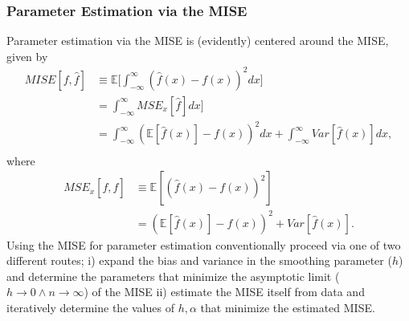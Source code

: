 \subsubsection{Parameter Estimation via the MISE}
Parameter estimation via the MISE is (evidently) centered around the MISE, given by
\begin{equation}
	\begin{split}
		MISE[f,\hat{f}]&\equiv \mathbb{E}\bigg[\int_{-\infty}^{\infty} (\hat{f}(x)-f(x))^2dx\bigg]\\
		&= \int_{-\infty}^{\infty} MSE_x[\hat{f}]dx\bigg]\\
		&= \int_{-\infty}^{\infty} (\mathbb{E}[\hat{f}(x)]-f(x))^2dx+\int_{-\infty}^{\infty}Var[\hat{f}(x)]dx,\\
	\end{split}
	\label{mse1}
\end{equation}
where
\begin{equation}
	\begin{split}
		MSE_x[f,\hat{f}]&\equiv \mathbb{E}[(\hat{f}(x)-f(x))^2]\\
		&=(\mathbb{E}[\hat{f}(x)]-f(x))^2+Var[\hat{f}(x)].
	\end{split}
\end{equation}
Using the MISE for parameter estimation conventionally proceed via one of two different routes; i) expand the bias and variance in the smoothing parameter ($h$) and determine the parameters that minimize the asymptotic limit ($h\rightarrow 0\wedge  n\rightarrow \infty$) of the MISE ii) estimate the MISE itself from data and iteratively determine the values of $h,\alpha$ that minimize the estimated MISE.  

